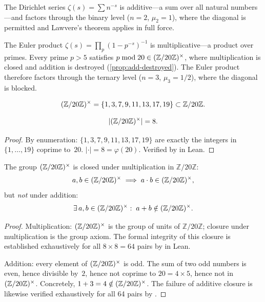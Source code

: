 The Dirichlet series $\zeta(s)=\sum n^{-s}$ is additive---a sum over all
natural numbers---and factors through the binary level ($n=2$, $\mu_2=1$),
where the diagonal is permitted and Lawvere's theorem applies in full force.

The Euler product $\zeta(s)=\prod_p(1-p^{-s})^{-1}$ is multiplicative---a
product over primes.  Every prime $p>5$ satisfies
$p\bmod 20\in(\mathbb{Z}/20\mathbb{Z})^\times$, where multiplication is closed and addition is
destroyed (\cref{prop:add-destroyed}).  The Euler product
therefore factors through the ternary level ($n=3$, $\mu_3=1/2$), where the
diagonal is blocked.

\begin{definition}\label{def:ZtwentyStar}
\begin{equation}\label{eq:ZtwentyStar}
  (\mathbb{Z}/20\mathbb{Z})^\times = \{1,3,7,9,11,13,17,19\} \subset \mathbb{Z}/20\mathbb{Z}.
\end{equation}
\end{definition}

\begin{proposition}[Cardinality]\label{prop:ZtwentyStar-card}
\begin{equation}\label{eq:ZtwentyStar-card}
  |(\mathbb{Z}/20\mathbb{Z})^\times| = 8.
\end{equation}
\end{proposition}

\begin{proof}
By enumeration: $\{1,3,7,9,11,13,17,19\}$ are exactly the integers
in $\{1,\ldots,19\}$ coprime to~$20$.  $|\cdot|=8=\varphi(20)$.
Verified by  in Lean.
\end{proof}

\begin{proposition}%
  \label{prop:add-destroyed}
The group $(\mathbb{Z}/20\mathbb{Z})^\times$ is closed under multiplication in
$\mathbb{Z}/20\mathbb{Z}$:
\begin{equation}\label{eq:mul-preserved}
  a,b\in(\mathbb{Z}/20\mathbb{Z})^\times \implies a\cdot b \in (\mathbb{Z}/20\mathbb{Z})^\times,
\end{equation}
but \emph{not} under addition:
\begin{equation}\label{eq:addition-destroyed}
  \exists\, a,b\in(\mathbb{Z}/20\mathbb{Z})^\times:\; a+b \notin (\mathbb{Z}/20\mathbb{Z})^\times.
\end{equation}
\end{proposition}

\begin{proof}
Multiplication: $(\mathbb{Z}/20\mathbb{Z})^\times$ is the group of units of
$\mathbb{Z}/20\mathbb{Z}$; closure under multiplication is the group
axiom.  The formal integrity of this closure is established
exhaustively for all $8\times 8 = 64$ pairs by  in Lean.

Addition: every element of $(\mathbb{Z}/20\mathbb{Z})^\times$ is odd.  The sum of two odd
numbers is even, hence divisible by~$2$, hence not coprime to
$20=4\times 5$, hence not in~$(\mathbb{Z}/20\mathbb{Z})^\times$.  Concretely, $1+3=4\notin(\mathbb{Z}/20\mathbb{Z})^\times$.
The failure of additive closure is likewise verified exhaustively
for all 64 pairs by . \end{proof}

